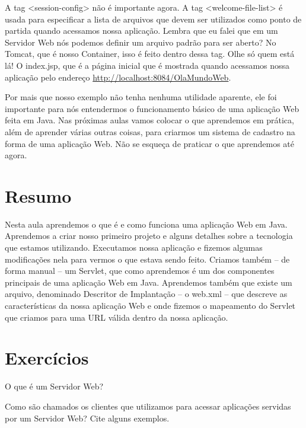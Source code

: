 A tag <session-config> não é importante agora. A tag <welcome-file-list> é usada para especificar a lista de arquivos que devem ser utilizados como ponto de partida quando acessamos nossa aplicação. Lembra que eu falei que em um Servidor Web nós podemos definir um arquivo padrão para ser aberto? No Tomcat, que é nosso Container, isso é feito dentro dessa tag. Olhe só quem está lá! O index.jsp, que é a página inicial que é mostrada quando acessamos nossa aplicação pelo endereço \url{http://localhost:8084/OlaMundoWeb}.

Por mais que nosso exemplo não tenha nenhuma utilidade aparente, ele foi importante para nós entendermos o funcionamento básico de uma aplicação Web feita em Java. Nas próximas aulas vamos colocar o que aprendemos em prática, além de aprender várias outras coisas, para criarmos um sistema de cadastro na forma de uma aplicação Web. Não se esqueça de praticar o que aprendemos até agora. 


\section{Resumo}

Nesta aula aprendemos o que é e como funciona uma aplicação Web em Java. Aprendemos a criar nosso primeiro projeto e alguns detalhes sobre a tecnologia que estamos utilizando. Executamos nossa aplicação e fizemos algumas modificações nela para vermos o que estava sendo feito. Criamos também – de forma manual – um Servlet, que como aprendemos é um dos componentes principais de uma aplicação Web em Java. Aprendemos também que existe um arquivo, denominado Descritor de Implantação – o web.xml – que descreve as características da nossa aplicação Web e onde fizemos o mapeamento do Servlet que criamos para uma URL válida dentro da nossa aplicação.


\section{Exercícios}

\begin{exercicioSemArquivo}{}{}{}
    O que é um Servidor Web?
\end{exercicioSemArquivo}

\begin{exercicioSemArquivo}{}{}{}
    Como são chamados os clientes que utilizamos para acessar aplicações servidas por um Servidor Web? Cite alguns exemplos.
\end{exercicioSemArquivo}

